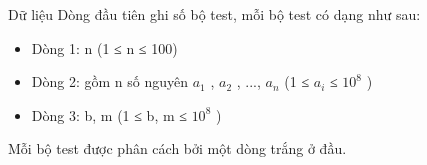 Dữ liệu
Dòng đầu tiên ghi số bộ test, mỗi bộ test có dạng như sau:
\begin{itemize}
	\item Dòng 1: n (1 ≤ n ≤ 100)
	\item Dòng 2: gồm n số nguyên $a_{1}$ , $a_{2}$ , ..., $a_{n}$ (1 ≤ $a_{i}$ ≤ $10^{8}$ )
	\item Dòng 3: b, m (1 ≤ b, m ≤ $10^{8}$ )
\end{itemize}

Mỗi bộ test được phân cách bởi một dòng trắng ở đầu.